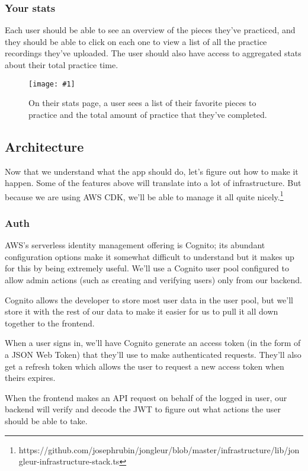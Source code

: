\documentclass{article}
\newcommand{\screenshot}[2]{
  \begin{figure}[h]
    \texttt{[image: \#1]}
    \caption*{#2}
  \end{figure}
}
\begin{document}
\subsubsection{Your stats}

Each user should be able to see an overview of the pieces they've practiced, and they should be able to click on each one to view a list of all the practice recordings they've uploaded.
The user should also have access to aggregated stats about their total practice time.

\screenshot{jong-stats}{On their stats page, a user sees a list of their favorite pieces to practice and the total amount of practice that they've completed.}

\subsection{Architecture}

Now that we understand what the app should do, let's figure out how to make it happen.
Some of the features above will translate into a lot of infrastructure.
But because we are using AWS CDK, we'll be able to manage it all quite nicely.\footnote{https://github.com/josephrubin/jongleur/blob/master/infrastructure/lib/jongleur-infrastructure-stack.ts}

\subsubsection{Auth}

AWS's serverless identity management offering is Cognito; its abundant configuration options make it somewhat difficult to understand but it makes up for this by being extremely useful.
We'll use a Cognito user pool configured to allow admin actions (such as creating and verifying users) only from our backend.

Cognito allows the developer to store most user data in the user pool, but we'll store it with the rest of our data to make it easier for us to pull it all down together to the frontend.

When a user signs in, we'll have Cognito generate an access token (in the form of a JSON Web Token) that they'll use to make authenticated requests.
They'll also get a refresh token which allows the user to request a new access token when theirs expires.

When the frontend makes an API request on behalf of the logged in user, our backend will verify and decode the JWT to figure out what actions the user should be able to take.
\end{document}
